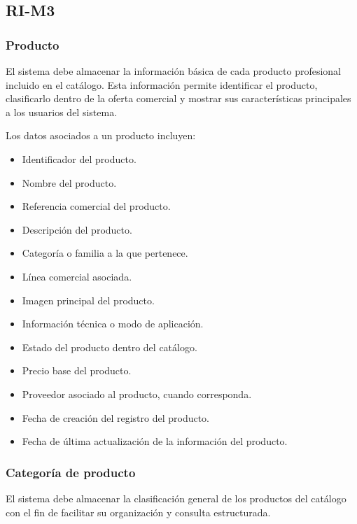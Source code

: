 \subsection{RI-M3}

\subsubsection*{Producto}

El sistema debe almacenar la información básica de cada producto profesional incluido en el catálogo. Esta información permite identificar el producto, clasificarlo dentro de la oferta comercial y mostrar sus características principales a los usuarios del sistema.

Los datos asociados a un producto incluyen:

\begin{itemize}
    \item Identificador del producto.
    \item Nombre del producto.
    \item Referencia comercial del producto.
    \item Descripción del producto.
    \item Categoría o familia a la que pertenece.
    \item Línea comercial asociada.
    \item Imagen principal del producto.
    \item Información técnica o modo de aplicación.
    \item Estado del producto dentro del catálogo.
    \item Precio base del producto.
    \item Proveedor asociado al producto, cuando corresponda.
    \item Fecha de creación del registro del producto.
    \item Fecha de última actualización de la información del producto.
\end{itemize}

\subsubsection*{Categoría de producto}

El sistema debe almacenar la clasificación general de los productos del catálogo con el fin de facilitar su organización y consulta estructurada.

